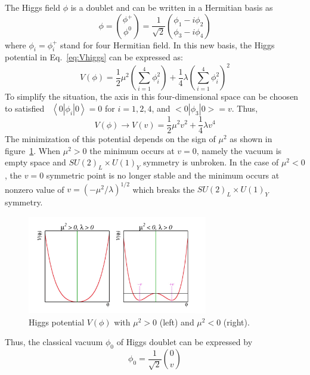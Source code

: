 The Higgs field $\phi$ is a doublet and can be written in a Hermitian basis as
\begin{equation}
	\phi = \binom{\phi^{+}}{\phi^{0}} = \frac{1}{\sqrt{2}} \binom{\phi_{1} - i\phi_{2}}{\phi_{3} - i\phi_{4}}
\end{equation}
where $\phi_{i} = \phi_{i}^{+}$ stand for four Hermitian field. 
In this new basis, the Higgs potential in Eq.~\ref{eq:Vhiggs} can be expressed as:
\begin{equation}
	V(\phi) = \frac{1}{2}\mu^{2}\left(\sum_{i=1}^{4}\phi_{i}^{2}\right) + \frac{1}{4}\lambda\left(\sum_{i=1}^{4}\phi_{i}^{2}\right)^{2}
\end{equation}
To simplify the situation, the axis in this four-dimensional space can be choosen to satisfied
~$\left<0\left| \phi_{i} \right|0\right> = 0$ for $i = 1, 2, 4$, and $<0\left| \phi_{3} \right|0> = v$. Thus,
\begin{equation}
	V(\phi) \rightarrow V(v) = \frac{1}{2}\mu^{2}v^{2} + \frac{1}{4}\lambda v^{4}
\end{equation}
The minimization of this potential depends on the sign of $\mu^{2}$ as shown in figure~\ref{fig:C2_Higgs_potential}.
When $\mu^{2} > 0$ the minimum occurs at $v = 0$, namely the vacuum is empty space and $SU(2)_{L} \times U(1)_{Y}$ symmetry is unbroken.
In the case of $\mu^{2} < 0$, the $v = 0$ symmetric point is no longer stable and the minimum occurs at nonzero value of 
$v = \left( -\mu^{2}/\lambda\right)^{1/2}$ which breaks the $SU(2)_{L} \times U(1)_{Y}$ symmetry.
\begin{figure}[!htb]
  \centering
  \includegraphics[width=0.7\textwidth]{figures/Theory/Vhiggs.png}
  \caption{Higgs potential $V(\phi)$ with $\mu^{2}>0$ (left) and $\mu^{2}<0$ (right).}
  \label{fig:C2_Higgs_potential}
\end{figure}
Thus, the classical vacuum $\phi_{0}$ of Higgs doublet can be expressed by
\begin{equation}
	\phi_{0} = \frac{1}{\sqrt{2}}\binom{0}{v}
\end{equation}
